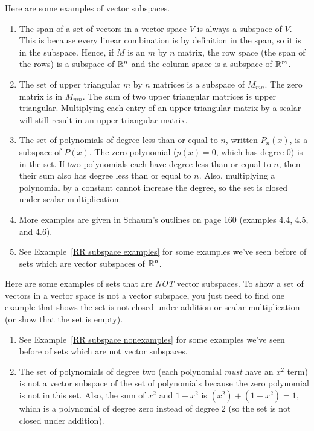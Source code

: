 \begin{example} Here are some examples of vector subspaces.
\begin{enumerate}
	\item  The span of a set of vectors in a vector space $V$ is always a subspace of $V$. This is because every linear combination is by definition in the span, so it is in the subspace.  Hence, if $M$ is an $m$ by $n$ matrix, the row space (the span of the rows) is a subspace of $\mathbb{R}^n$ and the column space is a subspace of $\mathbb{R}^m$.
	\item  The set of upper triangular $m$ by $n$ matrices is a subspace of $M_{mn}$. The zero matrix is in $M_{mn}$. The sum of two upper triangular matrices is upper triangular.  Multiplying each entry of an upper triangular matrix by a scalar will still result in an upper triangular matrix.
	\item  The set of polynomials of degree less than or equal to $n$, written $P_n(x)$, is a subspace of $P(x)$. The zero polynomial ($p(x)=0$, which has degree 0) is in the set.  If two polynomials each have degree less than or equal to $n$, then their sum also has degree less than or equal to $n$.  Also, multiplying a polynomial by a constant cannot increase the degree, so the set is closed under scalar multiplication.
	\item  More examples are given in Schaum's outlines on page 160 (examples 4.4, 4.5, and 4.6).
        \item See Example~\ref{RR subspace examples} for some examples we've seen before of sets which are vector subspaces of $\mathbb{R}^n$.
\end{enumerate}
\end{example}

\begin{example}
Here are some examples of sets that are \emph{NOT} vector subspaces. To show a set of vectors in a vector space is not a vector subspace, you just need to find one example that shows the set is not closed under addition or scalar multiplication (or show that the set is empty).
\begin{enumerate}
        \item See Example~\ref{RR subspace nonexamples} for some examples we've seen before of sets which are not vector subspaces.
	\item The set of polynomials of degree two (each polynomial \emph{must} have an $x^2$ term) is not a vector subspace of the set of polynomials because the zero polynomial is not in this set. Also, the sum of $x^2$ and $1-x^2$ is $(x^2)+(1-x^2)=1$, which is a polynomial of degree zero instead of degree 2 (so the set is not closed under addition).
\end{enumerate}
\end{example}





